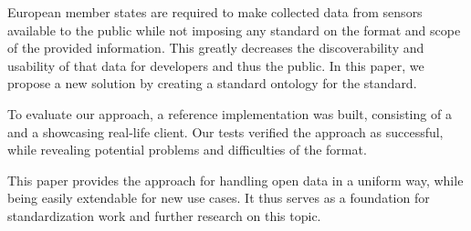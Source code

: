 European member states are required to make collected data from sensors available to the public while not imposing any standard on the format and scope of the provided information. This greatly decreases the discoverability and usability of that data for developers and thus the public. In this paper, we propose a new solution by creating a standard ontology for the  standard.

To evaluate our approach, a reference implementation was built, consisting of a  and a showcasing real-life client. Our tests verified the approach as successful, while revealing potential problems and difficulties of the  format.

This paper provides the approach for handling open data in a uniform way, while being easily extendable for new use cases. It thus serves as a foundation for standardization work and further research on this topic.
